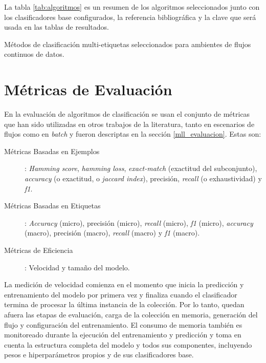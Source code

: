 La tabla \ref{tab:algoritmos} es un resumen de los algoritmos seleccionados
junto con los clasificadores base configurados, la referencia bibliográfica y la
clave que será usada en las tablas de resultados.

\begin{table}[htbp]
	\centering
	\begin{adjustbox}{max width=\textwidth}
		
	\end{adjustbox}
	\caption{Métodos de clasificación multi-etiquetas seleccionados para ambientes
		de flujos continuos de datos.}
	\label{tab:algoritmos}
\end{table}

\section{Métricas de Evaluación}

En la evaluación de algoritmos de clasificación se usan el conjunto de métricas
que han sido utilizadas en otros trabajos de la literatura, tanto en escenarios
de flujos \cite{sousa_multi-label_2018, zheng_survey_2020,
	osojnik_multi-label_2017} como en \textit{batch} \cite{madjarov_extensive_2012,
	zhang_multi-label_2010, gibaja_tutorial_2015} y fueron descriptas en la
sección \ref{mll_evaluacion}. Estas son:

\begin{description}

	\item[Métricas Basadas en Ejemplos]: \textit{Hamming score}, \textit{hamming
		      loss}, \textit{exact-match} (exactitud del subconjunto),
	      \textit{accuracy} (o exactitud, o \textit{jaccard index}), precisión,
	      \textit{recall} (o exhaustividad) y \textit{f1}.

	\item[Métricas Basadas en Etiquetas]: \textit{Accuracy} (micro), precisión
	      (micro), \textit{recall} (micro), \textit{f1} (micro),
	      \textit{accuracy} (macro), precisión (macro), \textit{recall} (macro)
	      y \textit{f1} (macro).

	\item[Métricas de Eficiencia]: Velocidad y tamaño del modelo.

\end{description}

La medición de velocidad comienza en el momento que inicia la predicción y
entrenamiento del modelo por primera vez y finaliza cuando el clasificador
termina de procesar la última instancia de la colección. Por lo tanto, quedan
afuera las etapas de evaluación, carga de la colección en memoria, generación
del flujo y configuración del entrenamiento. El consumo de memoria también es
monitoreado durante la ejecución del entrenamiento y predicción y toma en cuenta
la estructura completa del modelo y todos sus componentes, incluyendo pesos e
hiperparámetros propios y de sus clasificadores base.

